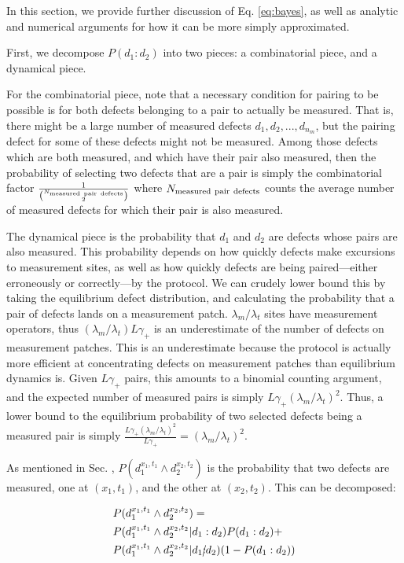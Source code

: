\documentclass[twocolumn,superscriptaddress,aps,prb,floatfix]{revtex4-1}
\begin{document}
In this section, we provide further discussion of Eq. \ref{eq:bayes}, as well as analytic and numerical arguments for how it can be more simply approximated.

First, we decompose $P(d_1 : d_2)$ into two pieces: a combinatorial piece, and a dynamical piece.

For the combinatorial piece, note that a necessary condition for pairing to be possible is for both defects belonging to a pair to actually be measured.  That is, there might be a large number of measured defects ${d_1, d_2, ..., d_{n_m}}$, but the pairing defect for some of these defects might not be measured. Among those defects which are both measured, and which have their pair also measured, then the probability of selecting two defects that are a pair is simply the combinatorial factor $\frac{1}{\binom{N_{\rm{measured\ pair\ defects}}}{2}}$ where $N_{\rm{measured\ pair\ defects}}$ counts the average number of measured defects for which their pair is also measured.

The dynamical piece is the probability that $d_1$ and $d_2$ are defects whose pairs are also measured.  This probability depends on how quickly defects make excursions to measurement sites, as well as how quickly defects are being paired---either erroneously or correctly---by the protocol.  We can crudely lower bound this by taking the equilibrium defect distribution, and calculating the probability that a pair of defects lands on a measurement patch.  $\lambda_m / \lambda_t$ sites have measurement operators, thus $(\lambda_m / \lambda_t) L \gamma_+$ is an underestimate of the number of defects on measurement patches.  This is an underestimate because the protocol is actually more efficient at concentrating defects on measurement patches than equilibrium dynamics is.  Given $L \gamma_+$ pairs, this amounts to a binomial counting argument, and the expected number of measured pairs is simply $L \gamma_+ (\lambda_m / \lambda_t)^2$.  Thus, a lower bound to the equilibrium probability of two selected defects being a measured pair is simply $\frac{L \gamma_+(\lambda_m / \lambda_t)^2}{L \gamma_+} = (\lambda_m / \lambda_t)^2$.

As mentioned in Sec. \label{sec:bayes_prob_calc}, $P(d_1^{x_1,t_1}\wedge d_2^{x_2,t_2})$ is the probability that two defects are measured, one at $(x_1,t_1)$, and the other at $(x_2,t_2)$.  This can be decomposed:

\begin{align}
&P(d_1^{x_1,t_1}\wedge d_2^{x_2,t_2}) = \\ \notag
&P(d_1^{x_1,t_1} \wedge d_2^{x_2,t_2} | d_1:d_2) P(d_1 : d_2) + \\ \notag 
&P(d_1^{x_1,t_1} \wedge d_2^{x_2,t_2} | d_1\cancel{:}d_2) (1 - P(d_1 : d_2))
\end{align}
\end{document}
